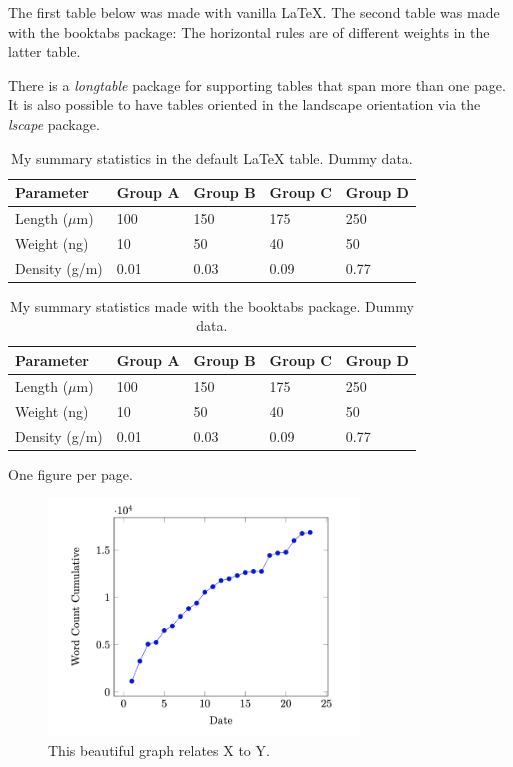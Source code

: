 \documentclass[11pt,letterpaper]{article}
\begin{document}
The first table below was made with vanilla LaTeX.
The second table was made with the booktabs package: The horizontal rules are of different weights in the latter table.

There is a \emph{longtable} package for supporting tables that span more than one page.
It is also possible to have tables oriented in the landscape orientation via the \emph{lscape} package.



\newpage

\begin{table}[htp]
  \centering
  \caption{\label{tab:first} My summary statistics in the default LaTeX table. Dummy data.}
\begin{tabular}{lllll}\hline
 Parameter & Group A & Group B & Group C &  Group D \\ \hline
 Length ($\mu$m) & 100 & 150 & 175 &  250\\
 Weight (ng)  &  10 &  50 & 40  &  50\\
 Density (g/m) & 0.01  & 0.03  &  0.09 &  0.77\\ \hline
\end{tabular}
\end{table}


\newpage


\begin{table}[htp]
  \centering
  \caption{\label{tab:first} My summary statistics made with the booktabs package. Dummy data.}
\begin{tabular}{lllll}\toprule %
 Parameter & Group A & Group B & Group C &  Group D \\ \midrule
 Length ($\mu$m) & 100 & 150 & 175 &  250\\
 Weight (ng)  &  10 &  50 & 40  &  50\\
 Density (g/m) & 0.01  & 0.03  &  0.09 &  0.77\\ \bottomrule
\end{tabular}
\end{table}


\newpage
\listoffigures
One figure per page. 

\newpage

\begin{figure}[htp]
  \begin{center}
  \includegraphics[width=3.25in]{./figs/wcPlot}
  \caption{\label{fig:labelA} This beautiful graph relates X to Y. }
  \end{center}
\end{figure}
\end{document}
